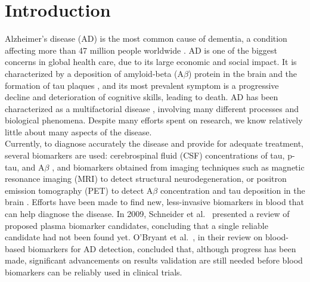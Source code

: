 
\section{Introduction}
Alzheimer's disease (AD) is the most common cause of dementia, a condition affecting more than 47 million people worldwide \cite{AlzheimersAssociation}. AD is one of the biggest concerns in global health care, due to its large economic and social impact. It is characterized by a deposition of amyloid-beta (A$\beta$) protein in the brain and the formation of tau plaques \cite{Jack2018}, and its most prevalent symptom is a progressive decline and deterioration of cognitive skills, leading to death. AD has been characterized as a multifactorial disease \cite{Jack2013,Jack2018}, involving many different processes and biological phenomena. Despite many efforts spent on research, we know relatively little about many aspects of the disease. \\

Currently, to diagnose accurately the disease and provide for adequate treatment, several biomarkers are used: cerebrospinal fluid (CSF) concentrations of tau, p-tau, and A$\beta$ \cite{Andreasen1999}, and biomarkers obtained from imaging techniques such as magnetic resonance imaging (MRI) to detect structural neurodegeneration, or positron emission tomography (PET) to detect A$\beta$ concentration and tau deposition in the brain \cite{Weiner2005,Clark2011}. Efforts have been made to find new, less-invasive biomarkers in blood that can help diagnose the disease. In 2009, Schneider et al.\ \cite{Schneider2009} presented a review of proposed plasma biomarker candidates, concluding that a single reliable candidate had not been found yet. O'Bryant et al.\ \cite{Obryant}, in their review on blood-based biomarkers for AD detection, concluded that, although progress has been made, significant advancements on results validation are still needed before blood biomarkers can be reliably used in clinical trials. \\

